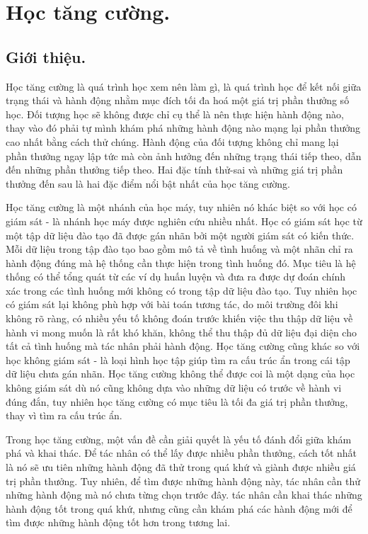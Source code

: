 \documentclass{uetgraduation}
\begin{document}


\section{Học tăng cường.}
\subsection{Giới thiệu.}
Học tăng cường là quá trình học xem nên làm gì, là quá trình học để kết nối giữa trạng thái và hành động nhằm mục đích tối đa hoá một giá trị phần thưởng số học. Đối tượng học sẽ không được chỉ cụ thể là
nên thực hiện hành động nào, thay vào đó phải tự mình khám phá những hành động nào mạng lại phần thưởng cao nhất bằng cách thử chúng. Hành động của đối tượng không chỉ mang lại phần thưởng ngay lập tức mà còn ảnh hưởng
đến những trạng thái tiếp theo, dẫn đến những phần thưởng tiếp theo. Hai đặc tính thử-sai và những giá trị phần thưởng đến sau là hai đặc điểm nổi bật nhất của học tăng cường.

Học tăng cường là một nhánh của học máy, tuy nhiên nó khác biệt so với học có giám sát - là nhánh học máy được nghiên cứu nhiều nhất. Học có giám sát học từ một tập dữ liệu đào tạo đã được gán nhãn
bởi một người giám sát có kiến thức. Mỗi dữ liệu trong tập đào tạo bao gồm mô tả về tình huống và một nhãn chỉ ra hành động đúng mà hệ thống cần thực hiện trong tình huống đó. Mục tiêu là hệ thống
có thể tổng quát từ các ví dụ huấn luyện và đưa ra được dự đoán chính xác trong các tình huống mới không có trong tập dữ liệu đào tạo. Tuy nhiên học có giám sát lại không phù hợp với bài toán tương
tác, do môi trường đôi khi không rõ ràng, có nhiều yếu tố không đoán trước khiến việc thu thập dữ liệu về hành vi mong muốn là rất khó khăn, không thể thu thập đủ dữ liệu đại diện cho tất cả tình huống
mà tác nhân phải hành động. Học tăng cường cũng khác so với học không giám sát - là loại hình học tập giúp tìm ra cấu trúc ẩn trong cái tập dữ liệu chưa gán nhãn. Học tăng cường không thể được coi là
một dạng của học không giám sát dù nó cũng không dựa vào những dữ liệu có trước về hành vi đúng đắn, tuy nhiên học tăng cường có mục tiêu là tối đa giá trị phần thưởng, thay vì tìm ra cấu trúc ẩn.

Trong học tăng cường, một vấn đề cần giải quyết là yếu tố đánh đổi giữa khám phá và khai thác. Để tác nhân có thể lấy được nhiều phần thưởng, cách tốt nhất là nó sẽ ưu tiên những hành động đã thử trong
quá khứ và giành được nhiều giá trị phần thưởng. Tuy nhiên, để tìm được những hành động này, tác nhân cần thử những hành động mà nó chưa từng chọn trước đây. tác nhân cần khai thác những hành động tốt trong
quá khứ, nhưng cũng cần khám phá các hành động mới để tìm được những hành động tốt hơn trong tương lai.
\end{document}

